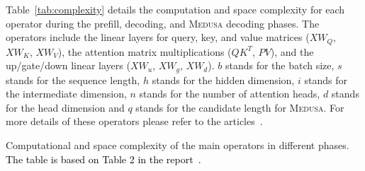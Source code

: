 \documentclass{article}
\theoremstyle{plain}
\theoremstyle{definition}
\theoremstyle{remark}
\newcommand{\ours}
{\textsc{Medusa}\xspace}
\begin{document}
Table~\ref{tab:complexity} details the computation and space complexity for each operator during the prefill, decoding, and \ours decoding phases. The operators include the linear layers for query, key, and value matrices ($XW_{Q}$, $XW_{K}$, $XW_{V}$), the attention matrix multiplications ($QK^T$, $PV$), and the up/gate/down linear layers ($XW_{u}$, $XW_{g}$, $XW_{d}$).
$b$ stands for the batch size, $s$ stands for the sequence length, $h$ stands for the hidden dimension, $i$ stands for the intermediate dimension, $n$ stands for the number of attention heads, $d$ stands for the head dimension and $q$ stands for the candidate length for \ours.
For more details of these operators please refer to the articles~\cite{touvron2023llama, chen2023transformer}.


\begin{table}[h]
\centering
\caption{Computational and space complexity of the main operators in different phases. \textcolor{black}{The table is based on Table 2 in the report~\cite{chen2023transformer}.}}


\end{table}
\end{document}
